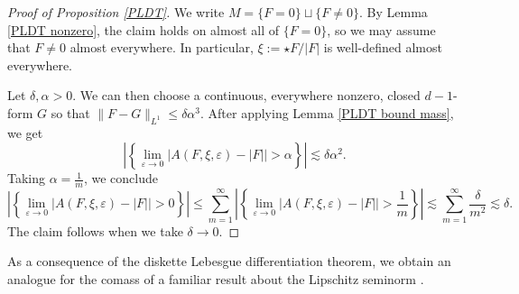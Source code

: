 \documentclass[reqno,11pt]{amsart}
\theoremstyle{definition}
\numberwithin{equation}{section}
\begin{document}
\begin{proof}[Proof of Proposition \ref{PLDT}]
We write $M = \{F = 0\} \sqcup \{F \neq 0\}$.
By Lemma \ref{PLDT nonzero}, the claim holds on almost all of $\{F = 0\}$, so we may assume that $F \neq 0$ almost everywhere.
In particular, $\xi := \star F/|F|$ is well-defined almost everywhere.

Let $\delta, \alpha > 0$.
We can then choose a continuous, everywhere nonzero, closed $d - 1$-form $G$ so that $\|F - G\|_{L^1} \leq \delta \alpha^3$.
After applying Lemma \ref{PLDT bound mass}, we get 
$$\left|\left\{\lim_{\varepsilon \to 0} |A(F, \xi, \varepsilon) - |F|| > \alpha\right\}\right| \lesssim \delta \alpha^2.$$
Taking $\alpha = \frac{1}{m}$, we conclude
$$\left|\left\{\lim_{\varepsilon \to 0} |A(F, \xi, \varepsilon) - |F|| > 0\right\}\right| \leq \sum_{m=1}^\infty \left|\left\{\lim_{\varepsilon \to 0} |A(F, \xi, \varepsilon) - |F|| > \frac{1}{m}\right\}\right| \lesssim \sum_{m=1}^\infty \frac{\delta}{m^2} \lesssim \delta.$$
The claim follows when we take $\delta \to 0$.
\end{proof}

As a consequence of the diskette Lebesgue differentiation theorem, we obtain an analogue for the comass of a familiar result about the Lipschitz seminorm \cite[Lemma 4.3]{Crandall2008}.
\end{document}
